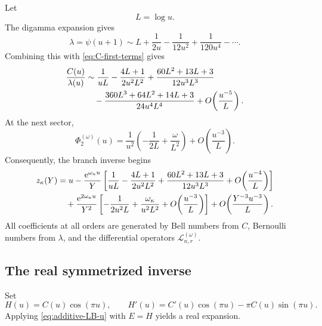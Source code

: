 \documentclass[11pt]{article}
\numberwithin{equation}{section}
\theoremstyle{mainthm}
\theoremstyle{defstyle}
\theoremstyle{remark}
\newcommand{\e}{\mathrm e}
\begin{document}
Let
\begin{equation}\label{eq:L-log-u}
 L=\log u.
\end{equation}
The digamma expansion \cite{DLMF511} gives
\begin{equation}\label{eq:lambda-expansion}
 \lambda=\psi(u+1)
 \sim L+\frac1{2u}-\frac1{12u^2}+\frac1{120u^4}-\cdots.
\end{equation}
Combining this with \cref{eq:C-first-terms} gives
\begin{align}
 \frac{C(u)}{\lambda(u)}
 &\sim \frac1{uL}
 -\frac{4L+1}{2u^2L^2}
 +\frac{60L^2+13L+3}{12u^3L^3}\notag\\
 &\quad
 -\frac{360L^3+64L^2+14L+3}{24u^4L^4}
 +O\!\left(\frac{u^{-5}}{L}\right).
 \label{eq:C-over-lambda}
\end{align}
At the next sector,
\begin{equation}\label{eq:Phi2-leading-omega}
 \Phi_2^{(\omega)}(u)
 =\frac1{u^2}\left(-\frac1{2L}+\frac{\omega}{L^2}\right)
 +O\!\left(\frac{u^{-3}}{L}\right).
\end{equation}
Consequently, the branch inverse begins
\begin{align}
 z_\kappa(Y)
 &=u-\frac{\e^{\omega_\kappa u}}{Y}
 \left[
 \frac1{uL}-\frac{4L+1}{2u^2L^2}
 +\frac{60L^2+13L+3}{12u^3L^3}
 +O\!\left(\frac{u^{-4}}{L}\right)
 \right]\notag\\
 &\quad
 +\frac{\e^{2\omega_\kappa u}}{Y^2}
 \left[
 -\frac1{2u^2L}+\frac{\omega_\kappa}{u^2L^2}
 +O\!\left(\frac{u^{-3}}{L}\right)
 \right]
 +O\!\left(\frac{Y^{-3}u^{-3}}{L}\right).
 \label{eq:branch-expanded-two-sectors}
\end{align}
All coefficients at all orders are generated by Bell numbers from \(C\), Bernoulli numbers from \(\lambda\), and the differential operators \(\mathcal L_{n,r}^{(\omega)}\).

\subsection{The real symmetrized inverse}

Set
\begin{equation}\label{eq:H-cos}
 H(u)=C(u)\cos(\pi u),
 \qquad
 H'(u)=C'(u)\cos(\pi u)-\pi C(u)\sin(\pi u).
\end{equation}
Applying \cref{eq:additive-LB-u} with \(E=H\) yields a real expansion.
\end{document}
